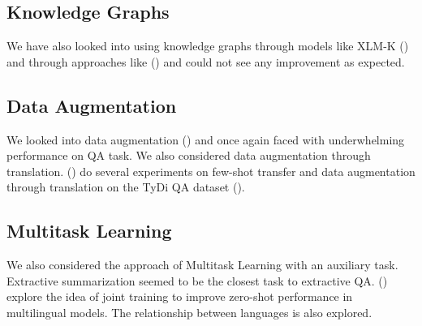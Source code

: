 \documentclass[12pt]{article}   %
\begin{document}

\subsection{Knowledge Graphs}
We have also looked into using knowledge graphs through models like XLM-K (\cite{xlmk}) and through approaches like (\cite{isdg}) and could not see any improvement as expected.


\subsection{Data Augmentation}
We looked into data augmentation (\cite{riabi-etal-2021-synthetic}) and once again faced with underwhelming performance on QA task. We also considered data augmentation through translation. (\cite{debnath-etal-2021-towards}) do several experiments on few-shot transfer and data augmentation through translation on the {T}y{D}i {QA} dataset (\cite{clark-etal-2020-tydi}).


\subsection{Multitask Learning}
We also considered the approach of Multitask Learning with an auxiliary task. Extractive summarization seemed to be the closest task to extractive QA. (\cite{ahuja-etal-2022-multi}) explore the idea of joint training to improve zero-shot performance in multilingual models. The relationship between languages is also explored.
\end{document}

